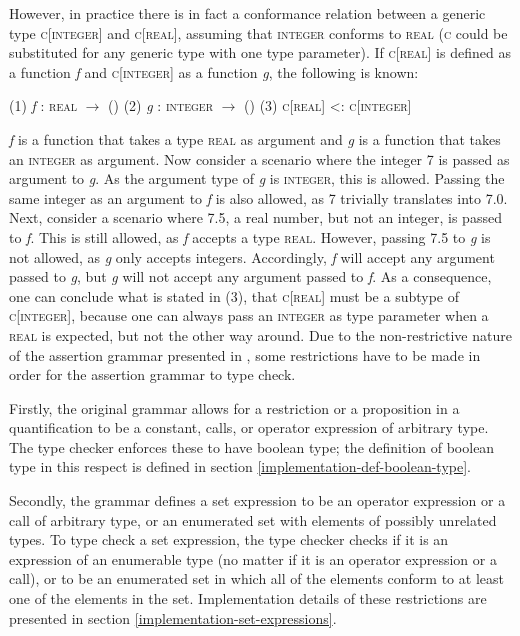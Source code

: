However, in practice there is in fact a conformance relation between a generic type  \textsc{c}[\textsc{integer}] and \textsc{c}[\textsc{real}], assuming that \textsc{integer} conforms to \textsc{real} (\textsc{c} could be substituted for any generic type with one type parameter). If \textsc{c}[\textsc{real}] is defined as a function \textit{f} and \textsc{c}[\textsc{integer}] as a function \textit{g}, the following is known:
\newline\newline
\centerline{
\footnotesize{
(1) \textit{f} : \textsc{real} $\rightarrow$ ()\newline
(2) \textit{g} : \textsc{integer} $\rightarrow$ ()\newline
(3) \textsc{c}[\textsc{real}] \textless : \textsc{c}[\textsc{integer}]
}}
\newline\newline
\textit{f} is a function that takes a type \textsc{real} as argument and \textit{g} is a function that takes an \textsc{integer} as argument. Now consider a scenario where the integer 7 is passed as argument to \textit{g}. As the argument type of \textit{g} is \textsc{integer}, this is allowed. Passing the same integer as an argument to \textit{f} is also allowed, as 7 trivially translates into 7.0. Next, consider a scenario where 7.5, a real number, but not an integer, is passed to \textit{f}. This is still allowed, as \textit{f} accepts a type \textsc{real}. However, passing 7.5 to \textit{g} is not allowed, as \textit{g} only accepts integers. Accordingly, \textit{f} will accept any argument passed to \textit{g}, but \textit{g} will not accept any argument passed to \textit{f}. As a consequence, one can conclude what is stated in (3), that  \textsc{c}[\textsc{real}] must be a subtype of \textsc{c}[\textsc{integer}], because one can always pass an \textsc{integer} as type parameter when a \textsc{real} is expected, but not the other way around.
Due to the non-restrictive nature of the assertion grammar presented in \cite{walden1995}, some restrictions have to be made in order for the assertion grammar to type check.

Firstly, the original grammar allows for a restriction or a proposition in a quantification to be a constant, calls, or operator expression of arbitrary type. The type checker enforces these to have boolean type; the definition of boolean type in this respect is defined in section \ref{implementation-def-boolean-type}.

Secondly,  the grammar defines a set expression to be an operator expression or a call of arbitrary type, or an enumerated set with elements of possibly unrelated types. To type check a set expression, the type checker checks if it is an expression of an enumerable type (no matter if it is an operator expression or a call), or to be an enumerated set in which all of the elements conform to at least one of the elements in the set. Implementation details of these restrictions are presented in section \ref{implementation-set-expressions}.



